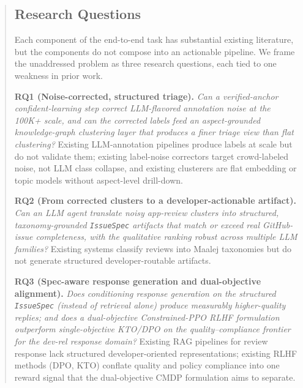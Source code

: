 \documentclass[sigconf, nonacm, anonymous, balance=false]{acmart}
\begin{document}
\begin{abstract}
\subsection{Research Questions}\label{research-questions}



Each component of the end-to-end task has substantial existing literature, but the components do not compose into an actionable pipeline. We frame the unaddressed problem as three research questions, each tied to one weakness in prior work.

\textbf{RQ1 (Noise-corrected, structured triage).} \emph{Can a verified-anchor confident-learning step correct LLM-flavored annotation noise at the 100K+ scale, and can the corrected labels feed an aspect-grounded knowledge-graph clustering layer that produces a finer triage view than flat clustering?} Existing LLM-annotation pipelines \cite{wang2021want, gilardi2023chatgpt} produce labels at scale but do not validate them; existing label-noise correctors \cite{northcutt2021cleanlab, patrini2017making} target crowd-labeled noise, not LLM class collapse, and existing clusterers \cite{villarroel2016, disorbo2016surf} are flat embedding or topic models without aspect-level drill-down.

\textbf{RQ2 (From corrected clusters to a developer-actionable artifact).} \emph{Can an LLM agent translate noisy app-review clusters into structured, taxonomy-grounded \texttt{IssueSpec} artifacts that match or exceed real GitHub-issue completeness, with the qualitative ranking robust across multiple LLM families?} Existing systems classify reviews into Maalej taxonomies \cite{maalej2016, dabrowski2022analysing} but do not generate structured developer-routable artifacts.

\textbf{RQ3 (Spec-aware response generation and dual-objective alignment).} \emph{Does conditioning response generation on the structured \texttt{IssueSpec} (instead of retrieval alone) produce measurably higher-quality replies; and does a dual-objective Constrained-PPO RLHF formulation outperform single-objective KTO/DPO on the quality--compliance frontier for the dev-rel response domain?} Existing RAG pipelines for review response \cite{gao2019rrgen, gao2020core} lack structured developer-oriented representations; existing RLHF methods (DPO, KTO) \cite{rafailov2023, ethayarajh2024} conflate quality and policy compliance into one reward signal that the dual-objective CMDP formulation \cite{dai2023, altman1999} aims to separate.


\end{abstract}
\end{document}
